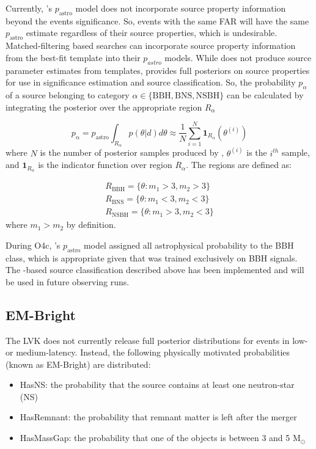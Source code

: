\begin{refsection}
Currently, \aframe's $p_{\mathrm{astro}}$ model does not incorporate source property information beyond the events significance. 
So, events with the same FAR will have the same $p_{\mathrm{astro}}$ estimate regardless of their source properties, which is undesirable. 
Matched-filtering based searches can incorporate source property information from the best-fit template into their $p_{astro}$ models. 
While \aframe does not produce source parameter estimates from templates, \amplfi provides full posteriors on source properties for use in significance estimation and source classification. 
So, the probability $p_{\alpha}$ of a source belonging to category $\alpha \in \{\mathrm{BBH}, \mathrm{BNS}, \mathrm{NSBH}\}$ can be calculated by integrating the \amplfi posterior over the appropriate region $R_{\alpha}$

\begin{equation}
    p_{\mathrm{\alpha}} = p_{\mathrm{astro}}\int_{R_{\alpha}} p(\theta |d) d\theta
    \approx \frac{1}{N}\sum_{i=1}^{N}\mathbf{1}_{R_\alpha}(\theta^{(i)})
\end{equation}
where $N$ is the number of posterior samples produced by \amplfi, $\theta^{(i)}$ is the $i^{th}$ sample, and $\mathbf{1}_{R_\alpha}$ is the indicator function over region $R_\alpha$.
The regions are defined as:

\begin{align}
    R_{\mathrm{BBH}} = \{ \theta : m_1 > 3, m_2 > 3\} \\
    R_{\mathrm{BNS}} = \{ \theta : m_1 <3, m_2 < 3\} \\ 
    R_{\mathrm{NSBH}} = \{ \theta: m_1 > 3, m_2 < 3\}
\end{align}
where $m_1 > m_2$ by definition.

During O4c, \aframe's $p_{\mathrm{astro}}$ model assigned all astrophysical probability to the BBH class, which is appropriate given that \aframe was trained exclusively on BBH signals.
The \amplfi-based source classification described above has been implemented and will be used in future observing runs.

\subsection{EM-Bright}
The LVK does not currently release full posterior distributions for events in low- or medium-latency. 
Instead, the following physically motivated probabilities (known as EM-Bright) are distributed:

\begin{itemize}
    \item HasNS: the probability that the source contains at least one neutron-star (NS)
    \item HasRemnant: the probability that remnant matter is left after the merger 
    \item HasMassGap: the probability that one of the objects is between 3 and 5 $\mathrm{M}_{\odot}$
\end{itemize}


\end{refsection}

